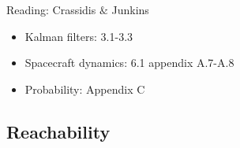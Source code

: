 \documentclass[11pt, a4paper]{article} %
\begin{document}
Reading: Crassidis $ \& $ Junkins 
\begin{itemize}
    \item Kalman filters: 3.1-3.3
    \item Spacecraft dynamics: 6.1 appendix A.7-A.8
    \item Probability: Appendix C
\end{itemize}

\subsection{Reachability}







% 
% 
\end{document}
